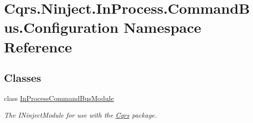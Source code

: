 \hypertarget{namespaceCqrs_1_1Ninject_1_1InProcess_1_1CommandBus_1_1Configuration}{}\section{Cqrs.\+Ninject.\+In\+Process.\+Command\+Bus.\+Configuration Namespace Reference}
\label{namespaceCqrs_1_1Ninject_1_1InProcess_1_1CommandBus_1_1Configuration}
\subsection*{Classes}
\begin{DoxyCompactItemize}
\item 
class \hyperlink{classCqrs_1_1Ninject_1_1InProcess_1_1CommandBus_1_1Configuration_1_1InProcessCommandBusModule}{In\+Process\+Command\+Bus\+Module}
\begin{DoxyCompactList}\small\item\em The I\+Ninject\+Module for use with the \hyperlink{namespaceCqrs}{Cqrs} package. \end{DoxyCompactList}\end{DoxyCompactItemize}
